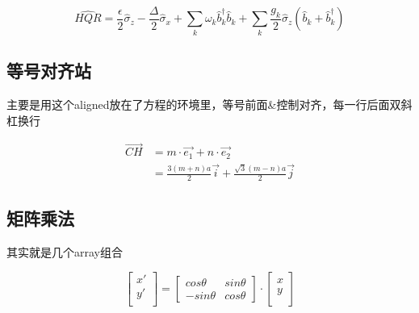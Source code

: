 \documentclass[AutoFakeBold]{LZUThesis}
\begin{document}
\begin{equation}
    \hat{HQR}=\frac{\epsilon}{2}\hat{\sigma}_{z}-\frac{\Delta}{2}\hat{\sigma}_{x}+\sum_{k}\omega_{k}\hat{b}_{k}^{\dagger}\hat{b}_{k}+\sum_{k}\frac{g_{k}}{2}\hat{\sigma}_{z}(\hat{b}_{k}+\hat{b}_{k}^{\dagger})\label{eq:sbm}
\end{equation}



\subsection{等号对齐站} %
\label{sub:等号对齐站}

主要是用这个aligned放在了方程的环境里，等号前面\&控制对齐，每一行后面双斜杠换行

\begin{equation}
    \begin{aligned}
        \vec{CH} & = m\cdot \vec{e_1} + n\cdot \vec{e_2}                          \\
                 & = \frac{3(m+n)a}{2} \vec{i} + \frac{\sqrt{3}(m-n)a}{2} \vec{j}
    \end{aligned}
    \label{ch}
\end{equation}


\subsection{矩阵乘法} %
\label{sub:矩阵乘法}

其实就是几个array组合

\begin{equation}
    \left[
        \begin{array}{c}
            x' \\
            y' \\
        \end{array}
        \right]=
    \left[
        \begin{array}{cc}
            cos \theta   & sin \theta \\
            - sin \theta & cos \theta
        \end{array}
        \right]
    \cdot
    \left[
        \begin{array}{c}
            x \\
            y \\
        \end{array}
        \right]
\end{equation}
\end{document}
